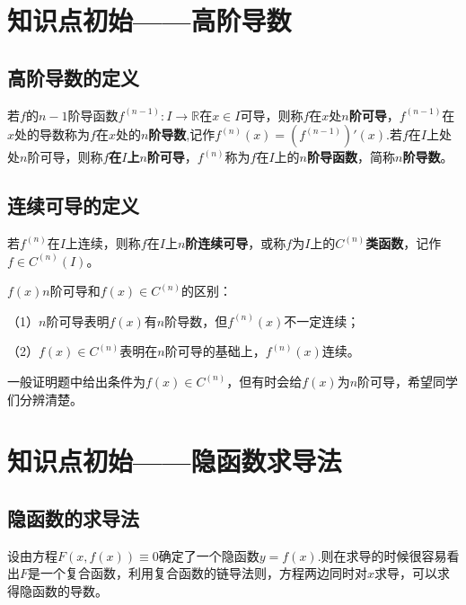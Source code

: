 \section{知识点初始——高阶导数}\label{sec:2.6}

\subsection{高阶导数的定义}\label{sec:2.6.1}

\begin{definition}
	若$f$的$n-1$阶导函数$f^{(n-1)}:I\to{\mathbb{R}}$在$x\in{I}$可导，则称$f$在$x$处\textbf{$n$阶可导}，$f^{(n-1)}$在$x$处的导数称为$f$在$x$处的\textbf{$n$阶导数},记作$f^{(n)}(x)=(f^{(n-1)})'(x)$.若$f$在$I$上处处$n$阶可导，则称$f$\textbf{在$I$上$n$阶可导}，$f^{(n)}$称为$f$在$I$上的\textbf{$n$阶导函数}，简称\textbf{$n$阶导数}。
\end{definition}

\subsection{连续可导的定义}\label{sec:2.6.2}

\begin{definition}
	若$f^{(n)}$在$I$上连续，则称$f$在$I$上\textbf{$n$阶连续可导}，或称$f$为$I$上的\textbf{$C^{(n)}$类函数}，记作$f\in{C^{(n)}(I)}$。
\end{definition}

\begin{remark}
	$f(x)n$阶可导和$f(x)\in{C^{(n)}}$的区别：
	
	（1）$n$阶可导表明$f(x)$有$n$阶导数，但$f^{(n)}(x)$不一定连续；
	
	（2）$f(x)\in{C^{(n)}}$表明在$n$阶可导的基础上，$f^{(n)}(x)$连续。
	
	一般证明题中给出条件为$f(x)\in{C^{(n)}}$，但有时会给$f(x)$为$n$阶可导，希望同学们分辨清楚。
\end{remark}

\section{知识点初始——隐函数求导法}\label{sec:2.7}

\subsection{隐函数的求导法}\label{sec:2.7.1}

设由方程$F(x,f(x))\equiv 0$确定了一个隐函数$y=f(x)$.则在求导的时候很容易看出$F$是一个复合函数，利用复合函数的链导法则，方程两边同时对$x$求导，可以求得隐函数的导数。


